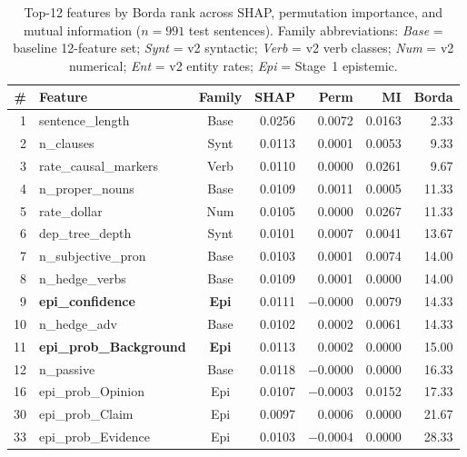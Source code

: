 \documentclass[conference]{IEEEtran}
\begin{document}
\begin{table}[t]
\centering
\caption{Top-12 features by Borda rank across SHAP, permutation
importance, and mutual information ($n{=}991$ test sentences). Family
abbreviations: \emph{Base} = baseline 12-feature set; \emph{Synt} = v2
syntactic; \emph{Verb} = v2 verb classes; \emph{Num} = v2 numerical;
\emph{Ent} = v2 entity rates; \emph{Epi} = Stage~1 epistemic.}
\label{tab:tri}
\footnotesize
\setlength{\tabcolsep}{2.5pt}
\begin{tabular}{rlcrrrr}
\toprule
\textbf{\#} & \textbf{Feature} & \textbf{Family} & \textbf{SHAP} & \textbf{Perm} & \textbf{MI} & \textbf{Borda} \\
\midrule
 1 & sentence\_length         & Base & 0.0256 & 0.0072 & 0.0163 &  2.33 \\
 2 & n\_clauses               & Synt & 0.0113 & 0.0001 & 0.0053 &  9.33 \\
 3 & rate\_causal\_markers    & Verb & 0.0110 & 0.0000 & 0.0261 &  9.67 \\
 4 & n\_proper\_nouns         & Base & 0.0109 & 0.0011 & 0.0005 & 11.33 \\
 5 & rate\_dollar             & Num  & 0.0105 & 0.0000 & 0.0267 & 11.33 \\
 6 & dep\_tree\_depth         & Synt & 0.0101 & 0.0007 & 0.0041 & 13.67 \\
 7 & n\_subjective\_pron      & Base & 0.0103 & 0.0001 & 0.0074 & 14.00 \\
 8 & n\_hedge\_verbs          & Base & 0.0109 & 0.0001 & 0.0000 & 14.00 \\
 9 & \textbf{epi\_confidence} & \textbf{Epi} & 0.0111 & $-0.0000$ & 0.0079 & 14.33 \\
10 & n\_hedge\_adv            & Base & 0.0102 & 0.0002 & 0.0061 & 14.33 \\
11 & \textbf{epi\_prob\_Background} & \textbf{Epi} & 0.0113 & 0.0002 & 0.0000 & 15.00 \\
12 & n\_passive               & Base & 0.0118 & $-0.0000$ & 0.0000 & 16.33 \\
\midrule
16 & epi\_prob\_Opinion       & Epi  & 0.0107 & $-0.0003$ & 0.0152 & 17.33 \\
30 & epi\_prob\_Claim         & Epi  & 0.0097 &  0.0006 & 0.0000 & 21.67 \\
33 & epi\_prob\_Evidence      & Epi  & 0.0103 & $-0.0004$ & 0.0000 & 28.33 \\
\bottomrule
\end{tabular}
\end{table}
\end{document}
